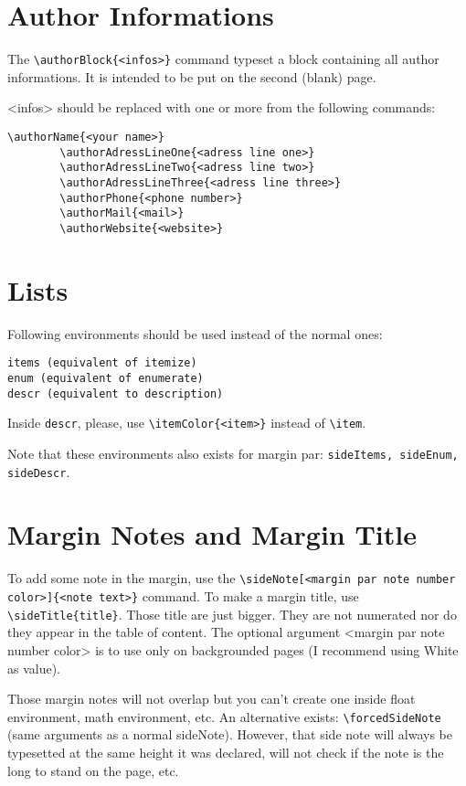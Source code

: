 \documentclass[a4paper, 11pt, oneside, fleqn]{article}
\begin{document}
	\section{Author Informations}
	The \lstinline[breaklines]|\authorBlock{<infos>}| command typeset a block containing all author informations. It is intended to be put on the second (blank) page.
	
	<infos> should be replaced with one or more from the following commands:
	\begin{lstlisting}[breaklines]
		\authorName{<your name>}
		\authorAdressLineOne{<adress line one>}
		\authorAdressLineTwo{<adress line two>}
		\authorAdressLineThree{<adress line three>}
		\authorPhone{<phone number>}
		\authorMail{<mail>}
		\authorWebsite{<website>}
	\end{lstlisting}
	
	
	\section{Lists}
	Following environments should be used instead of the normal ones:
	\begin{lstlisting}
items (equivalent of itemize)
enum (equivalent of enumerate)
descr (equivalent to description)
	\end{lstlisting}
	
	Inside \lstinline[breaklines]|descr|, please, use \lstinline[breaklines]|\itemColor{<item>}| instead of \lstinline[breaklines]|\item|.
	
	Note that these environments also exists for margin par: \lstinline[breaklines]|sideItems, sideEnum, sideDescr|.
	
	\section{Margin Notes and Margin Title}
	To add some note in the margin, use the \lstinline[breaklines]|\sideNote[<margin par note number color>]{<note text>}| command. To make a margin title, use \lstinline[breaklines]|\sideTitle{title}|. Those title are just bigger. They are not numerated nor do they appear in the table of content. The optional argument <margin par note number color> is to use only on backgrounded pages (I recommend using White as value).
	
	Those margin notes will not overlap but you can't create one inside float environment, math environment, etc. An alternative exists: \lstinline[breaklines]|\forcedSideNote| (same arguments as a normal sideNote). However, that side note will always be typesetted at the same height it was declared, will not check if the note is the long to stand on the page, etc.
	
\end{document}
